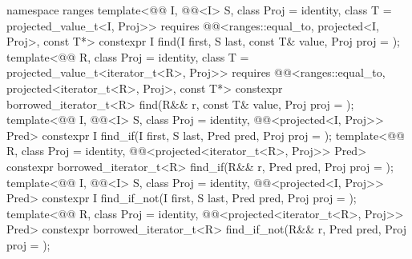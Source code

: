 \begin{codeblock}
{  namespace ranges {
    template<@@ I, @@<I> S, class Proj = identity,
             class T = projected_value_t<I, Proj>>
      requires @@<ranges::equal_to, projected<I, Proj>, const T*>
      constexpr I find(I first, S last, const T& value, Proj proj = {});
    template<@@ R, class Proj = identity,
             class T = projected_value_t<iterator_t<R>, Proj>>
      requires @@<ranges::equal_to,
                                         projected<iterator_t<R>, Proj>, const T*>
      constexpr borrowed_iterator_t<R>
        find(R&& r, const T& value, Proj proj = {});
    template<@@ I, @@<I> S, class Proj = identity,
             @@<projected<I, Proj>> Pred>
      constexpr I find_if(I first, S last, Pred pred, Proj proj = {});
    template<@@ R, class Proj = identity,
             @@<projected<iterator_t<R>, Proj>> Pred>
      constexpr borrowed_iterator_t<R>
        find_if(R&& r, Pred pred, Proj proj = {});
    template<@@ I, @@<I> S, class Proj = identity,
             @@<projected<I, Proj>> Pred>
      constexpr I find_if_not(I first, S last, Pred pred, Proj proj = {});
    template<@@ R, class Proj = identity,
             @@<projected<iterator_t<R>, Proj>> Pred>
      constexpr borrowed_iterator_t<R>
        find_if_not(R&& r, Pred pred, Proj proj = {});
  }

}
\end{codeblock}
